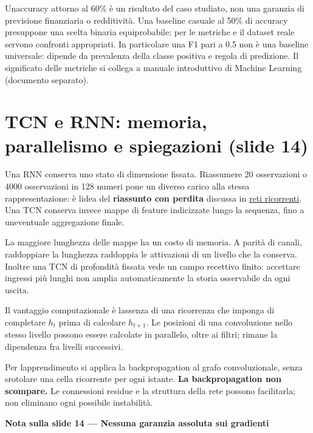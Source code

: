 \documentclass[11pt,a4paper,oneside,openany]{book}
\renewenvironment{quote}{\list{}{\leftmargin=1em\rightmargin=0pt}\item\relax}{\endlist}
\begin{document}
Un\textquotesingle accuracy attorno al 60\% è un risultato del caso studiato, non una garanzia di previsione finanziaria o redditività. Una baseline casuale al 50\% di accuracy presuppone una scelta binaria equiprobabile; per le metriche e il dataset reale servono confronti appropriati. In particolare una F1 pari a 0.5 non è una baseline universale: dipende da prevalenza della classe positiva e regola di predizione. Il significato delle metriche si collega a manuale introduttivo di Machine Learning (documento separato).

\section{TCN e RNN: memoria, parallelismo e spiegazioni (slide 14)}\label{f04-r251}

Una RNN conserva uno stato di dimensione fissata. Riassumere 20 osservazioni o 4000 osservazioni in 128 numeri pone un diverso carico alla stessa rappresentazione: è l\textquotesingle idea del \textbf{riassunto con perdita} discussa in \hyperref[fonte03]{reti ricorrenti}. Una TCN conserva invece mappe di feature indicizzate lungo la sequenza, fino a un\textquotesingle eventuale aggregazione finale.

La maggiore lunghezza delle mappe ha un costo di memoria. A parità di canali, raddoppiare la lunghezza raddoppia le attivazioni di un livello che la conserva. Inoltre una TCN di profondità fissata vede un campo recettivo finito: accettare ingressi più lunghi non amplia automaticamente la storia osservabile da ogni uscita.

Il vantaggio computazionale è l\textquotesingle assenza di una ricorrenza che imponga di completare \(h_t\) prima di calcolare \(h_{t+1}\). Le posizioni di una convoluzione nello stesso livello possono essere calcolate in parallelo, oltre ai filtri; rimane la dipendenza fra livelli successivi.

Per l\textquotesingle apprendimento si applica la backpropagation al grafo convoluzionale, senza srotolare una cella ricorrente per ogni istante. \textbf{La backpropagation non scompare.} Le connessioni residue e la struttura della rete possono facilitarla; non eliminano ogni possibile instabilità.

\begin{quote}
\textbf{Nota sulla slide 14 --- Nessuna garanzia assoluta sui gradienti}
\end{quote}
\end{document}
